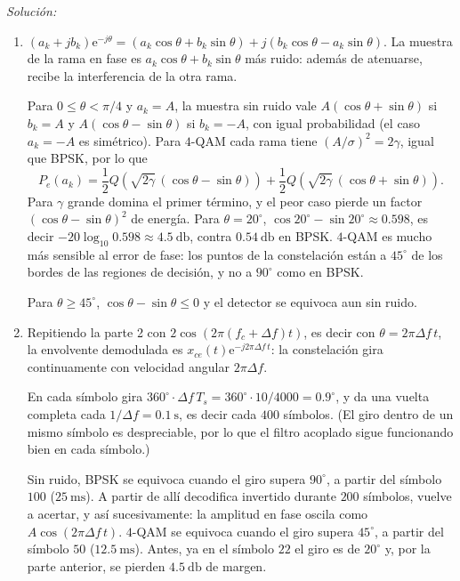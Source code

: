 \documentclass[a4paper,11pt]{article}
\newcommand{\e}{\mathrm{e}}
\newenvironment{solucion}[1][]{
\noindent \large \textsl{Solución:} \ifthenelse{\equal{#1}{}}{}{\emph{(#1)}}

\smallskip
}{
\bigskip
}
\begin{document}
\begin{solucion}
\begin{enumerate}
\item $(a_k+jb_k)\e^{-j\theta}=(a_k\cos\theta+b_k\sin\theta)+j(b_k\cos\theta-a_k\sin\theta)$. La muestra de la rama en fase es $a_k\cos\theta+b_k\sin\theta$ más ruido: además de atenuarse, recibe la interferencia de la otra rama.

Para $0\leqslant\theta<\pi/4$ y $a_k=A$, la muestra sin ruido vale $A(\cos\theta+\sin\theta)$ si $b_k=A$ y $A(\cos\theta-\sin\theta)$ si $b_k=-A$, con igual probabilidad (el caso $a_k=-A$ es simétrico). Para $4$-QAM cada rama tiene $(A/\sigma)^2=2\gamma$, igual que BPSK, por lo que
\begin{equation*}
P_e(a_k)=\frac12Q\left(\sqrt{2\gamma}\,(\cos\theta-\sin\theta)\right)+\frac12Q\left(\sqrt{2\gamma}\,(\cos\theta+\sin\theta)\right).
\end{equation*}
Para $\gamma$ grande domina el primer término, y el peor caso pierde un factor $(\cos\theta-\sin\theta)^2$ de energía. Para $\theta=20^\circ$, $\cos20^\circ-\sin20^\circ\approx0.598$, es decir $-20\log_{10}0.598\approx4.5\ \unit{\decibel}$, contra $0.54\ \unit{\decibel}$ en BPSK. $4$-QAM es mucho más sensible al error de fase: los puntos de la constelación están a $45^\circ$ de los bordes de las regiones de decisión, y no a $90^\circ$ como en BPSK.

Para $\theta\geqslant45^\circ$, $\cos\theta-\sin\theta\leqslant0$ y el detector se equivoca aun sin ruido.

\item Repitiendo la parte 2 con $2\cos(2\pi(f_c+\Delta f)t)$, es decir con $\theta=2\pi\Delta f\,t$, la envolvente demodulada es $x_{ce}(t)\e^{-j2\pi\Delta f\,t}$: la constelación gira continuamente con velocidad angular $2\pi\Delta f$.

En cada símbolo gira $360^\circ\cdot\Delta f\,T_s=360^\circ\cdot10/4000=0.9^\circ$, y da una vuelta completa cada $1/\Delta f=0.1\ \unit{\second}$, es decir cada $400$ símbolos. (El giro dentro de un mismo símbolo es despreciable, por lo que el filtro acoplado sigue funcionando bien en cada símbolo.)

Sin ruido, BPSK se equivoca cuando el giro supera $90^\circ$, a partir del símbolo $100$ ($25\ \unit{\milli\second}$). A partir de allí decodifica invertido durante $200$ símbolos, vuelve a acertar, y así sucesivamente: la amplitud en fase oscila como $A\cos(2\pi\Delta f\,t)$. $4$-QAM se equivoca cuando el giro supera $45^\circ$, a partir del símbolo $50$ ($12.5\ \unit{\milli\second}$). Antes, ya en el símbolo $22$ el giro es de $20^\circ$ y, por la parte anterior, se pierden $4.5\ \unit{\decibel}$ de margen.


\end{enumerate}
\end{solucion}
\end{document}
